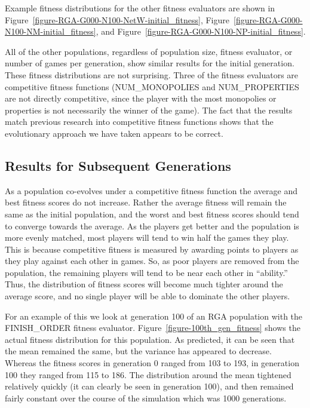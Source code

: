 Example fitness distributions for the other fitness evaluators are shown in
Figure~\ref{figure-RGA-G000-N100-NetW-initial_fitness},
Figure~\ref{figure-RGA-G000-N100-NM-initial_fitness}, and
Figure~\ref{figure-RGA-G000-N100-NP-initial_fitness}.

All of the other populations, regardless of population size, fitness evaluator,
or number of games per generation, show similar results for the initial
generation. These fitness distributions are not surprising. Three of the fitness
evaluators are competitive fitness functions (NUM\_MONOPOLIES and
NUM\_PROPERTIES are not directly competitive, since the player with the most
monopolies or properties is not necessarily the winner of the game). The fact
that the results match previous research into competitive fitness functions
shows that the evolutionary approach we have taken appears to be correct.

\subsection{Results for Subsequent Generations}

As a population co-evolves under a competitive fitness function the average and
best fitness scores do not increase. Rather the average fitness will remain the
same as the initial population, and the worst and best fitness scores should
tend to converge towards the average. As the players get better and the
population is more evenly matched, most players will tend to win half the games
they play. This is because competitive fitness is measured by awarding points to
players as they play against each other in games. So, as poor players are
removed from the population, the remaining players will tend to be near each
other in ``ability.'' Thus, the distribution of fitness scores will become much
tighter around the average score, and no single player will be able to dominate
the other players.

For an example of this we look at generation 100 of an RGA population with the
FINISH\_ORDER fitness evaluator. Figure~\ref{figure-100th_gen_fitness} shows
the actual fitness distribution for this population. As predicted, it can be
seen that the mean remained the same, but the variance has appeared to decrease.
Whereas the fitness scores in generation 0 ranged from 103 to 193, in generation
100 they ranged from 115 to 186. The distribution around the mean tightened
relatively quickly (it can clearly be seen in generation 100), and then remained
fairly constant over the course of the simulation which was 1000 generations.

